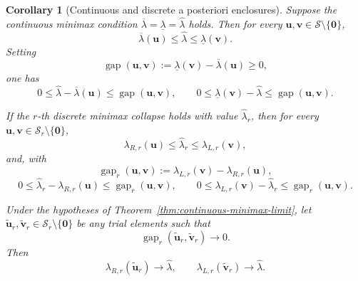 \documentclass[preprint,10pt]{elsarticle}
\theoremstyle{plain}
\newtheorem{corollary}{Corollary}
\theoremstyle{definition}
\theoremstyle{remark}
\begin{document}
\begin{corollary}[Continuous and discrete a posteriori enclosures]
	\label{cor:minimax-aposteriori-enclosures}
	Suppose the continuous minimax condition
	\(\overline\lambda=\underline\lambda=\hat\lambda\) holds. Then for every
	\(\mathbf{u},\mathbf{v}\in\mathcal{S}\setminus\{\mathbf{0}\}\),
	\begin{equation}\label{eq:continuous-certified-enclosure}
		\overline\lambda(\mathbf{u}) \le \hat\lambda \le \underline\lambda(\mathbf{v}).
	\end{equation}
	Setting
	\[
	\operatorname{gap}(\mathbf{u},\mathbf{v})
	:=
	\underline\lambda(\mathbf{v})-\overline\lambda(\mathbf{u})\ge0,
	\]
	one has
	\begin{equation}\label{eq:continuous-aposteriori-errors}
		0 \le \hat\lambda-\overline\lambda(\mathbf{u}) \le \operatorname{gap}(\mathbf{u},\mathbf{v}),
		\qquad
		0 \le \underline\lambda(\mathbf{v})-\hat\lambda \le \operatorname{gap}(\mathbf{u},\mathbf{v}).
	\end{equation}
	
	If the \(r\)-th discrete minimax collapse holds with value \(\hat\lambda_r\),
	then for every
	\(\mathbf{u},\mathbf{v}\in\mathcal{S}_r\setminus\{\mathbf{0}\}\),
	\begin{equation}\label{eq:discrete-certified-enclosure}
		\lambda_{R,r}(\mathbf{u}) \le \hat\lambda_r \le \lambda_{L,r}(\mathbf{v}),
	\end{equation}
	and, with
	\[
	\operatorname{gap}_r(\mathbf{u},\mathbf{v})
	:=
	\lambda_{L,r}(\mathbf{v})-\lambda_{R,r}(\mathbf{u}),
	\]
	\begin{equation}\label{eq:discrete-aposteriori-errors}
		0 \le \hat\lambda_r-\lambda_{R,r}(\mathbf{u}) \le \operatorname{gap}_r(\mathbf{u},\mathbf{v}),
		\qquad
		0 \le \lambda_{L,r}(\mathbf{v})-\hat\lambda_r \le \operatorname{gap}_r(\mathbf{u},\mathbf{v}).
	\end{equation}
	
	Under the hypotheses of Theorem~\ref{thm:continuous-minimax-limit}, let
	\(\widetilde{\mathbf{u}}_r,\widetilde{\mathbf{v}}_r
	\in\mathcal{S}_r\setminus\{\mathbf{0}\}\) be any trial elements such that
	\[
	\operatorname{gap}_r(\widetilde{\mathbf{u}}_r,\widetilde{\mathbf{v}}_r)\to0.
	\]
	Then
	\begin{equation}\label{eq:certificate-convergence}
		\lambda_{R,r}(\widetilde{\mathbf{u}}_r)\to\hat\lambda,
		\qquad
		\lambda_{L,r}(\widetilde{\mathbf{v}}_r)\to\hat\lambda.
	\end{equation}
\end{corollary}
\end{document}
